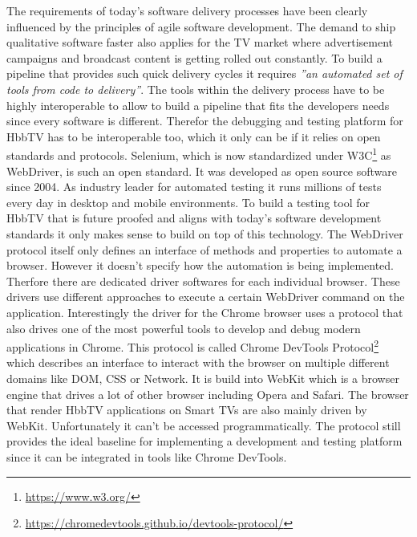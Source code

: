 The requirements of today's software delivery processes have been clearly influenced by the principles of agile software
development. The demand to ship qualitative software faster also applies for the TV market where advertisement campaigns
and broadcast content is getting rolled out constantly. To build a pipeline that provides such quick delivery cycles
it requires \textit{''an automated set of tools from code to delivery''}\cite{Lehtonen2015DefiningMF}. The tools
within the delivery process have to be highly interoperable to allow to build a pipeline that fits the developers
needs since every software is different. Therefor the debugging and testing platform for HbbTV has to be interoperable
too, which it only can be if it relies on open standards and protocols. Selenium, which is now standardized under
W3C\footnote{\url{https://www.w3.org/}} as WebDriver, is such an open standard. It was developed as open source
software since 2004. As industry leader for automated testing it runs millions of tests every day in desktop and mobile
environments. To build a testing tool for HbbTV that is future proofed and aligns with today's software development
standards it only makes sense to build on top of this technology. The WebDriver protocol itself only defines an
interface of methods and properties to automate a browser. However it doesn't specify how the automation is being
implemented. Therfore there are dedicated driver softwares for each individual browser. These drivers use different
approaches to execute a certain WebDriver command on the application. Interestingly the driver for the Chrome browser
uses a protocol that also drives one of the most powerful tools to develop and debug modern applications in Chrome.
This protocol is called Chrome DevTools Protocol\footnote{\url{https://chromedevtools.github.io/devtools-protocol/}}
which describes an interface to interact with the browser on multiple different domains like DOM, CSS or Network. It
is build into WebKit which is a browser engine that drives a lot of other browser including Opera and Safari. The
browser that render HbbTV applications on Smart TVs are also mainly driven by WebKit. Unfortunately it can't be accessed
programmatically. The protocol still provides the ideal baseline for implementing a development and testing platform
since it can be integrated in tools like Chrome DevTools.

